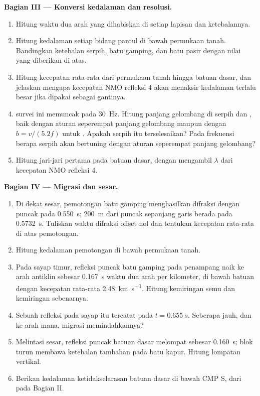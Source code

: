\begin{problem}
\noindent\textbf{Bagian III --- Konversi kedalaman dan resolusi.}
\begin{enumerate}[resume]
  \item Hitung waktu dua arah yang dihabiskan di setiap lapisan dan ketebalannya.
  \item Hitung kedalaman setiap bidang pantul di bawah permukaan tanah. Bandingkan
        ketebalan serpih, batu gamping, dan batu pasir dengan nilai
        yang diberikan di atas.
  \item Hitung kecepatan rata-rata dari permukaan tanah hingga batuan dasar, dan jelaskan mengapa
        kecepatan NMO refleksi 4 akan menaksir kedalaman terlalu besar jika dipakai
        sebagai gantinya.
  \item {} survei ini memuncak pada \qty{30}{Hz}. Hitung panjang gelombang di
        serpih dan , baik dengan aturan seperempat panjang gelombang
        maupun dengan $b = v/(5.2f)$ untuk . Apakah serpih itu terselesaikan? Pada
        frekuensi berapa serpih akan bertuning dengan aturan seperempat panjang gelombang?
  \item Hitung jari-jari  pertama pada batuan dasar, dengan mengambil
        $\lambda$ dari kecepatan NMO refleksi 4.
\end{enumerate}

\noindent\textbf{Bagian IV --- Migrasi dan sesar.}
\begin{enumerate}[resume]
  \item Di dekat sesar, pemotongan batu gamping menghasilkan difraksi
        dengan puncak pada \qty{0.550}{s}; \qty{200}{m} dari puncak sepanjang garis
        berada pada \qty{0.5732}{s}. Tuliskan waktu difraksi offset nol dan
        tentukan kecepatan rata-rata di atas pemotongan.
  \item Hitung kedalaman pemotongan di bawah permukaan tanah.
  \item Pada sayap timur, refleksi puncak batu gamping pada penampang 
        naik ke arah antiklin sebesar \qty{0.167}{s} waktu dua arah per
        kilometer, di bawah batuan dengan kecepatan rata-rata \qty{2.48}{km.s^{-1}}. Hitung
        kemiringan semu dan kemiringan sebenarnya.
  \item Sebuah refleksi pada sayap itu tercatat pada $t = \qty{0.655}{s}$. Seberapa jauh,
        dan ke arah mana, migrasi memindahkannya?
  \item Melintasi sesar, refleksi puncak batuan dasar melompat sebesar \qty{0.160}{s};
        blok turun membawa ketebalan tambahan pada batu kapur. Hitung
        lompatan vertikal.
  \item Berikan kedalaman ketidakselarasan batuan dasar di bawah CMP S, dari
         pada Bagian II.
\end{enumerate}
\end{problem}
